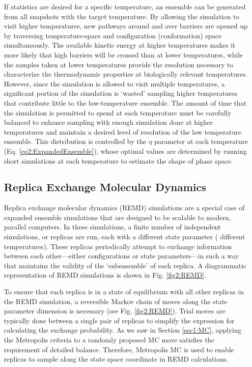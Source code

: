 If statistics are desired for a specific temperature, an ensemble can be
generated from all snapshots with the target temperature. By allowing the
simulation to visit higher temperatures, new pathways around and over barriers
are opened up by traversing temperature-space and configuration (conformation)
space simultaneously. The available kinetic energy at higher temperatures makes
it more likely that high barriers will be crossed than at lower temperatures,
while the samples taken at lower temperatures provide the resolution necessary
to characterize the thermodynamic properties at biologically relevant
temperatures. However, since the simulation is allowed to visit multiple
temperatures, a significant portion of the simulation is `wasted' sampling
higher temperatures that contribute little to the low-temperature ensemble. The
amount of time that the simulation is permitted to spend at each temperature
must be carefully balanced to enhance sampling with enough simulation done at
higher temperatures and maintain a desired level of resolution of the low
temperature ensemble. This distribution is controlled by the $\eta$ parameter at
each temperature (Eq. \ref{eq2:ExpandedEnsemble}), whose optimal values are
determined by running short simulations at each temperature to estimate the
shape of phase space. \cite{Lyubartsev_JChemPhys_1992_v96_p1776}

\subsection{Replica Exchange Molecular Dynamics}

Replica exchange molecular dynamics (REMD) simulations are a special case of
expanded ensemble simulations that are designed to be scalable to modern,
parallel computers. In these simulations, a finite number of independent
simulations, or replicas are run, each with a different state parameter (\eg
different temperatures). These replicas periodically attempt to exchange
information between each other---either configurations or state parameters---in
such a way that maintains the validity of the `subensemble' of each replica. A
diagrammatic representation of REMD simulations is shown in Fig.
\ref{fig2:REMD}. \cite{Sugita_ChemPhysLett_1999_v314_p141}

To ensure that each replica is in a state of equilibrium with all other replicas
in the REMD simulation, a reversible Markov chain of moves along the state
parameter dimension is necessary (see Fig. \ref{fig2:REMD}). Trial moves are
typically done between a single pair of replicas to simplify the expression for
calculating the exchange probability. As we saw in Section \ref{sec1:MC},
applying the Metropolis criteria to a randomly proposed MC move satisfies the
requirement of detailed balance. Therefore, Metropolis MC is used to enable
replicas to sample along the state space coordinate in REMD calculations.

